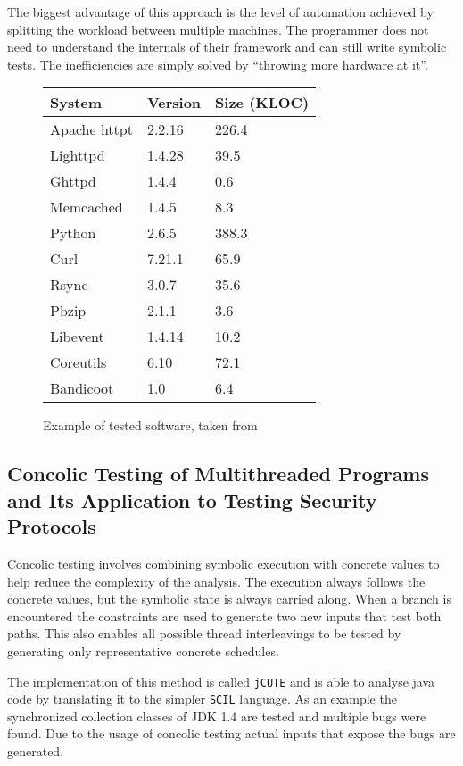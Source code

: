 \documentclass[10pt]{llncs}
\begin{document}
The biggest advantage of this approach is the level of automation achieved by splitting the workload between multiple machines. The programmer does not need to understand the internals of their framework and can still write symbolic tests. The inefficiencies are simply solved by ``throwing more hardware at it''.

\begin{figure}
	\centering
	
	\begin{tabular}{l l l}
		System & Version & Size (KLOC) \\
		\hline
		Apache httpt & 2.2.16 & 226.4 \\
		Lighttpd & 1.4.28 & 39.5 \\
		Ghttpd & 1.4.4 & 0.6 \\
		Memcached & 1.4.5 & 8.3 \\
		Python & 2.6.5 & 388.3 \\
		Curl & 7.21.1 & 65.9 \\
		Rsync & 3.0.7 & 35.6 \\
		Pbzip & 2.1.1 & 3.6 \\
		Libevent & 1.4.14 & 10.2 \\
		Coreutils & 6.10 & 72.1 \\
		Bandicoot & 1.0 & 6.4
	\end{tabular}
	
	\caption{Example of tested software, taken from \cite{base3}}
	\label{example:3}
\end{figure}

\subsection{Concolic Testing of Multithreaded Programs and	Its Application to Testing Security Protocols \cite{base4}}

Concolic testing involves combining symbolic execution with concrete values to help reduce the complexity of the analysis. The execution always follows the concrete values, but the symbolic state is always carried along. When a branch is encountered the constraints are used to generate two new inputs that test both paths. This also enables all possible thread interleavings to be tested by generating only representative concrete schedules.

The implementation of this method is called \texttt{jCUTE} and is able to analyse java code by translating it to the simpler \texttt{SCIL} language. As an example the synchronized collection classes of JDK 1.4 are tested and multiple bugs were found. Due to the usage of concolic testing actual inputs that expose the bugs are generated. 
\end{document}
